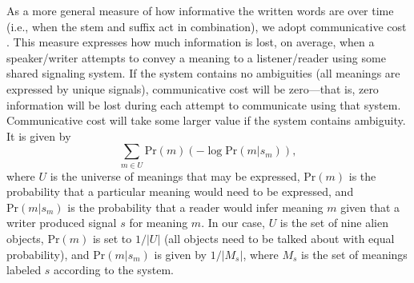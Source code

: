 \documentclass[doc,biblatex]{apa7}
\begin{document}
As a more general measure of how informative the written words are over time (i.e., when the stem and suffix act in combination), we adopt communicative cost \parencite{KempRegier:2012, Kemp:2018, Regier:2015}. This measure expresses how much information is lost, on average, when a speaker/writer attempts to convey a meaning to a listener/reader using some shared signaling system. If the system contains no ambiguities (all meanings are expressed by unique signals), communicative cost will be zero---that is, zero information will be lost during each attempt to communicate using that system. Communicative cost will take some larger value if the system contains ambiguity. It is given by
	\begin{equation}
	\sum_{m \in U} \mathrm{Pr}(m) ( -\log \mathrm{Pr}(m|s_m) ),
	\end{equation}
where $U$ is the universe of meanings that may be expressed, $\mathrm{Pr}(m)$ is the probability that a particular meaning would need to be expressed, and $\mathrm{Pr}(m|s_m)$ is the probability that a reader would infer meaning $m$ given that a writer produced signal $s$ for meaning $m$. In our case, $U$ is the set of nine alien objects, $\mathrm{Pr}(m)$ is set to $1/|U|$ (all objects need to be talked about with equal probability), and $\mathrm{Pr}(m|s_m)$ is given by $1/|M_s|$, where $M_s$ is the set of meanings labeled $s$ according to the system.
\end{document}
